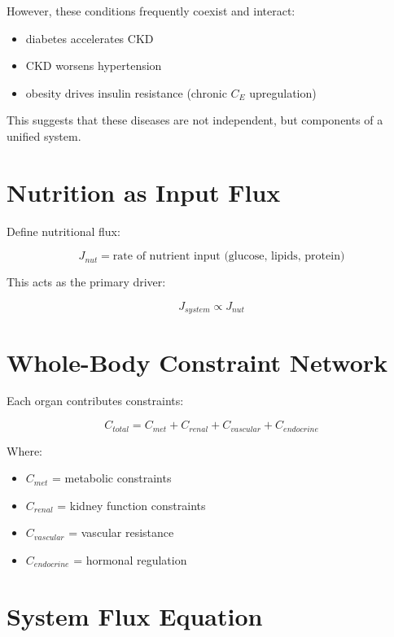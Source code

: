 \documentclass[11pt]{article}
\begin{document}
However, these conditions frequently coexist and interact:

\begin{itemize}
    \item diabetes accelerates CKD
    \item CKD worsens hypertension
    \item obesity drives insulin resistance (chronic $C_E$ upregulation)
\end{itemize}

This suggests that these diseases are not independent, but components of a unified system.

\section{Nutrition as Input Flux}

Define nutritional flux:

\begin{equation}
J_{nut} = \text{rate of nutrient input (glucose, lipids, protein)}
\end{equation}

This acts as the primary driver:

\begin{equation}
J_{system} \propto J_{nut}
\end{equation}

\section{Whole-Body Constraint Network}

Each organ contributes constraints:

\begin{equation}
C_{total} = C_{met} + C_{renal} + C_{vascular} + C_{endocrine}
\end{equation}

Where:

\begin{itemize}
    \item $C_{met}$ = metabolic constraints
    \item $C_{renal}$ = kidney function constraints
    \item $C_{vascular}$ = vascular resistance
    \item $C_{endocrine}$ = hormonal regulation
\end{itemize}

\section{System Flux Equation}
\end{document}
